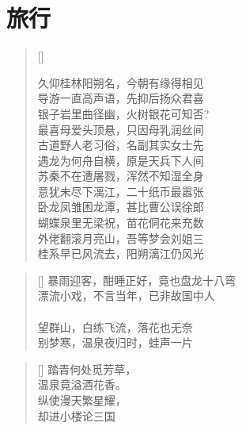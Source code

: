 \chapter{旅行}
\thispagestyle{empty}
\renewcommand{\poemtoc}{subsection}
\settowidth{\versewidth}{久仰桂林阳朔名，今朝有缘得相见}
\begin{verse}[\versewidth]

久仰桂林阳朔名，今朝有缘得相见\\
导游一直高声语，先抑后扬众君喜\\
银子岩里曲径幽，火树银花可知否?\\
最喜母爱头顶悬，只因母乳润丝间\\
古道野人老习俗，名副其实女士先\\
遇龙为何舟自横，原是天兵下人间\\
苏秦不在遭屠戮，浑然不知湿全身\\
意犹未尽下漓江，二十纸币最嚣张\\
卧龙凤雏困龙潭，甚比曹公误徐郎\\
蝴蝶泉里无梁祝，苗花侗花来充数\\
外佬翻滚月亮山，吾等梦会刘姐三\\
桂系早已风流去，阳朔漓江仍风光
\end{verse}

\renewcommand{\poemtoc}{subsection}
\settowidth{\versewidth}{久仰桂林阳朔名，今朝有缘得相见}
\begin{verse}[\versewidth]
暴雨迎客，酣睡正好，竟也盘龙十八弯\\
漂流小戏，不言当年，已非故国中人\\
~\\
望群山，白练飞流，落花也无奈\\
别梦寒，温泉夜归时，蛙声一片\\
\end{verse}

\renewcommand{\poemtoc}{subsection}
\settowidth{\versewidth}{踏青何处觅芳草}
\begin{verse}[\versewidth]
踏青何处觅芳草，\\
温泉竟溢酒花香。\\
纵使漫天繁星耀，\\
却进小楼论三国
\end{verse}

